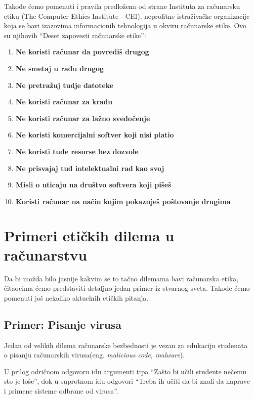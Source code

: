 \documentclass[a4paper]{article}
\begin{document}
Takođe ćemo pomenuti i pravila predložena od strane Instituta za računarsku etiku (The Computer Ethics Institute - CEI), neprofitne istraživačke organizacije koja se bavi izazovima informacionih tehnologija u okviru računarske etike. Ovo su njihovih ``Deset zapovesti računarske etike''\cite{ice}:

\begin{enumerate}
	\item \textbf{Ne koristi računar da povrediš drugog}
	\item \textbf{Ne smetaj u radu drugog}
	\item \textbf{Ne pretražuj tudje datoteke}
	\item \textbf{Ne koristi računar za krađu}
	\item \textbf{Ne koristi računar za lažno svedočenje}
	\item \textbf{Ne koristi komercijalni softver koji nisi platio}
	\item \textbf{Ne koristi tuđe resurse bez dozvole}
	\item \textbf{Ne prisvajaj tuđ intelektualni rad kao svoj}
	\item \textbf{Misli o uticaju na društvo softvera koji pišeš}
	\item \textbf{Koristi računar na način kojim pokazuješ poštovanje drugima}
\end{enumerate}

\section{Primeri etičkih dilema u računarstvu}

Da bi možda bilo jasnije kakvim se to tačno dilemama bavi računarska etika, čitaocima ćemo predstaviti detaljno jedan primer iz stvarnog sveta. Takođe ćemo pomenuti još nekoliko aktuelnih etičkih pitanja.

\subsection{Primer: Pisanje virusa}
Jedan od velikih dilema računarske bezbednosti je vezan za edukaciju studenata o pisanju računarskih virusa(eng. \textit{malicious code, malware}).

U prilog odričnom odgovoru idu argumenti tipa ``Zašto bi učili studente nečemu sto je loše'', dok u suprotnom idu odgovori ``Treba ih učiti da bi znali da
naprave i primene sisteme odbrane od virusa''.
\end{document}
